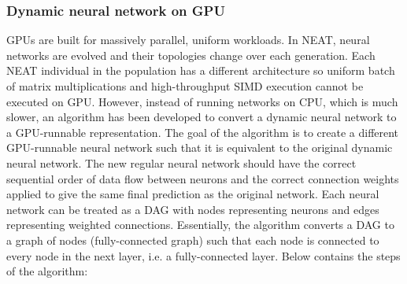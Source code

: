 \subsubsection{Dynamic neural network on GPU}
\label{subsubsec:dynamic_nn_on_gpu}
GPUs are built for massively parallel, uniform workloads. In NEAT, neural networks are evolved and their topologies change over each generation. Each NEAT individual in the population has a different architecture so uniform batch of matrix multiplications and high-throughput SIMD execution cannot be executed on GPU. However, instead of running networks on CPU, which is much slower, an algorithm has been developed to convert a dynamic neural network to a GPU-runnable representation. The goal of the algorithm is to create a different GPU-runnable neural network such that it is equivalent to the original dynamic neural network. The new regular neural network should have the correct sequential order of data flow between neurons and the correct connection weights applied to give the same final prediction as the original network. Each neural network can be treated as a DAG with nodes representing neurons and edges representing weighted connections. Essentially, the algorithm converts a DAG to a graph of nodes (fully-connected graph) such that each node is connected to every node in the next layer, i.e. a fully-connected layer. Below contains the steps of the algorithm: 
